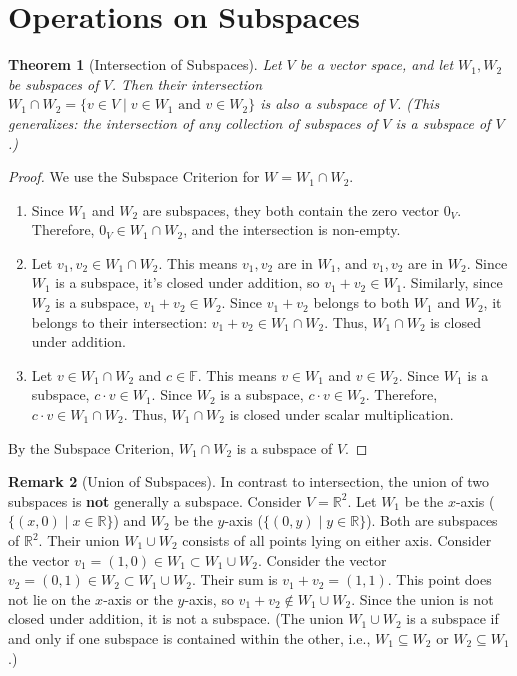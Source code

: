 \documentclass[11pt]{article}
\newtheorem{theorem}{Theorem}[section]
\theoremstyle{definition}
\newtheorem{remark}[theorem]{Remark}
\newcommand{\F}{\mathbb{F}}
\newcommand{\R}{\mathbb{R}}
\begin{document}
\section{Operations on Subspaces}

\begin{theorem}[Intersection of Subspaces]
Let $V$ be a vector space, and let $W_1, W_2$ be subspaces of $V$. Then their intersection $W_1 \cap W_2 = \{ v \in V \mid v \in W_1 \text{ and } v \in W_2 \}$ is also a subspace of $V$.
(This generalizes: the intersection of any collection of subspaces of $V$ is a subspace of $V$.)
\end{theorem}

\begin{proof}
We use the Subspace Criterion for $W = W_1 \cap W_2$.
\begin{enumerate}
    \item Since $W_1$ and $W_2$ are subspaces, they both contain the zero vector $0_V$. Therefore, $0_V \in W_1 \cap W_2$, and the intersection is non-empty.
    \item Let $v_1, v_2 \in W_1 \cap W_2$. This means $v_1, v_2$ are in $W_1$, and $v_1, v_2$ are in $W_2$. Since $W_1$ is a subspace, it's closed under addition, so $v_1 + v_2 \in W_1$. Similarly, since $W_2$ is a subspace, $v_1 + v_2 \in W_2$. Since $v_1 + v_2$ belongs to both $W_1$ and $W_2$, it belongs to their intersection: $v_1 + v_2 \in W_1 \cap W_2$. Thus, $W_1 \cap W_2$ is closed under addition.
    \item Let $v \in W_1 \cap W_2$ and $c \in \F$. This means $v \in W_1$ and $v \in W_2$. Since $W_1$ is a subspace, $c \cdot v \in W_1$. Since $W_2$ is a subspace, $c \cdot v \in W_2$. Therefore, $c \cdot v \in W_1 \cap W_2$. Thus, $W_1 \cap W_2$ is closed under scalar multiplication.
\end{enumerate}
By the Subspace Criterion, $W_1 \cap W_2$ is a subspace of $V$.
\end{proof}

\begin{remark}[Union of Subspaces]
In contrast to intersection, the union of two subspaces is \textbf{not} generally a subspace.
Consider $V = \R^2$. Let $W_1$ be the $x$-axis ($\{(x, 0) \mid x \in \R\}$) and $W_2$ be the $y$-axis ($\{(0, y) \mid y \in \R\}$). Both are subspaces of $\R^2$.
Their union $W_1 \cup W_2$ consists of all points lying on either axis.
Consider the vector $v_1 = (1, 0) \in W_1 \subset W_1 \cup W_2$.
Consider the vector $v_2 = (0, 1) \in W_2 \subset W_1 \cup W_2$.
Their sum is $v_1 + v_2 = (1, 1)$. This point does not lie on the $x$-axis or the $y$-axis, so $v_1 + v_2 \notin W_1 \cup W_2$.
Since the union is not closed under addition, it is not a subspace.
(The union $W_1 \cup W_2$ is a subspace if and only if one subspace is contained within the other, i.e., $W_1 \subseteq W_2$ or $W_2 \subseteq W_1$.)
\end{remark}
\end{document}
